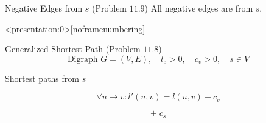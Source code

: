 \begin{frame}
  \begin{exampleblock}{Negative Edges from $s$ (Problem $11.9$)}
    All negative edges are from $s$.
  \end{exampleblock}

  \pause
\end{frame}
\begin{frame}<presentation:0>[noframenumbering]
  \begin{exampleblock}{Generalized Shortest Path (Problem $11.8$)}
    \[
      \text{Digraph } G = (V, E),\quad l_e > 0,\quad c_v > 0,\quad s \in V
    \]

    \centerline{Shortest paths from $s$}
  \end{exampleblock}

  \pause
  \[
    \forall u \to v: l'(u,v) = l(u,v) + c_v
  \]

  \pause
  \[
    +\; c_s
  \]
\end{frame}
